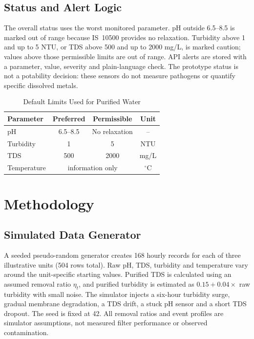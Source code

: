 \documentclass[10pt,letterpaper,twocolumn]{article}
\begin{document}
\subsection{Status and Alert Logic}
The overall status uses the worst monitored parameter. pH outside 6.5--8.5 is marked out of range because IS~10500 provides no relaxation. Turbidity above 1 and up to 5 NTU, or TDS above 500 and up to 2000 mg/L, is marked caution; values above those permissible limits are out of range. API alerts are stored with a parameter, value, severity and plain-language check. The prototype status is not a potability decision: these sensors do not measure pathogens or quantify specific dissolved metals.

\begin{table}[t]
\caption{Default Limits Used for Purified Water}
\centering\small
\begin{tabular}{lccc}
\toprule
Parameter & Preferred & Permissible & Unit\\
\midrule
pH & 6.5--8.5 & No relaxation & --\\
Turbidity & 1 & 5 & NTU\\
TDS & 500 & 2000 & mg/L\\
Temperature & \multicolumn{2}{c}{information only} & $^\circ$C\\
\bottomrule
\end{tabular}
\end{table}

\section{Methodology}
\subsection{Simulated Data Generator}
A seeded pseudo-random generator creates 168 hourly records for each of three illustrative units (504 rows total). Raw pH, TDS, turbidity and temperature vary around the unit-specific starting values. Purified TDS is calculated using an assumed removal ratio $\eta_t$, and purified turbidity is estimated as $0.15+0.04\times$ raw turbidity with small noise. The simulator injects a six-hour turbidity surge, gradual membrane degradation, a TDS drift, a stuck pH sensor and a short TDS dropout. The seed is fixed at 42. All removal ratios and event profiles are simulator assumptions, not measured filter performance or observed contamination.
\end{document}
